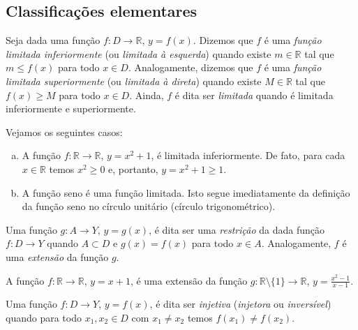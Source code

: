 \subsection{Classificações elementares}

\begin{defn}
  Seja dada uma função $f:D\to\mathbb{R}$, $y=f(x)$. Dizemos que $f$ é uma \emph{função limitada inferiormente} (ou \emph{limitada à esquerda}) quando existe $m\in \mathbb{R}$ tal que $m\leq f(x)$ para todo $x\in D$. Analogamente, dizemos que $f$ é uma \emph{função limitada superiormente} (ou \emph{limitada à direta}) quando existe $M\in \mathbb{R}$ tal que $f(x)\geq M$ para todo $x\in D$. Ainda, $f$ é dita ser \emph{limitada} quando é limitada inferiormente e superiormente.
\end{defn}

\begin{ex}
  Vejamos os seguintes casos:
  \begin{enumerate}[a)]
  \item A função $f:\mathbb{R}\to\mathbb{R}$, $y=x^2+1$, é limitada inferiormente. De fato, para cada $x\in \mathbb{R}$ temos $x^2\geq 0$ e, portanto, $y = x^2+1 \geq 1$.
  \item A função seno é uma função limitada. Isto segue imediatamente da definição da função seno no círculo unitário (círculo trigonométrico).
  \end{enumerate}
\end{ex}

\begin{defn}
  Uma função $g:A\to Y$, $y=g(x)$, é dita ser uma \emph{restrição} da dada função $f:D\to Y$ quando $A\subset D$ e $g(x)=f(x)$ para todo $x\in A$. Analogamente, $f$ é uma \emph{extensão} da função $g$.
\end{defn}

\begin{ex}
  A função $f:\mathbb{R}\to\mathbb{R}$, $y=x+1$, é uma extensão da função $g:\mathbb{R}\setminus\{1\}\to\mathbb{R}$, $\displaystyle y=\frac{x^2-1}{x-1}$.
\end{ex}

\begin{defn}
  Uma função $f:D\to Y$, $y=f(x)$, é dita ser \emph{injetiva} (\emph{injetora} ou \emph{inversível}) quando para todo $x_1, x_2\in D$ com $x_1\neq x_2$ temos $f(x_1)\neq f(x_2)$.
\end{defn}

